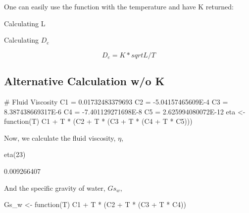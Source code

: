 \documentclass{tufte-handout}
\begin{document}
One can easily use the function with the temperature and have K returned: 

\begin{Schunk}
\begin{Sinput}
 
\end{Sinput}
\end{Schunk}

Calculating L

\begin{Schunk}
\begin{Sinput}
 
\end{Sinput}
\end{Schunk}

Calculating $D_e$

\begin{equation}
D_e = K * sqrt{L/T}
\end{equation}

\begin{Schunk}
\begin{Sinput}
 
\end{Sinput}
\end{Schunk}

\subsection{Alternative Calculation w/o K}

\begin{Schunk}
\begin{Sinput}
 # Fluid Viscosity
 C1 = 0.01732483379693
 C2 = -5.04157465609E-4
 C3 = 8.387438669317E-6
 C4 = -7.401129271698E-8
 C5 = 2.625994080072E-12
 eta <- function(T){
 C1 + T * (C2 + T * (C3 + T * (C4 + T * C5)))
 } 
\end{Sinput}
\end{Schunk}

Now, we calculate the fluid viscosity, $\eta$, 

\begin{Schunk}
\begin{Sinput}
 eta(23)
\end{Sinput}
\begin{Soutput}
[1] 0.009266407
\end{Soutput}
\end{Schunk}


And the specific gravity of water, $Gs_w$, 

\begin{Schunk}
\begin{Sinput}
 Gs_w <- function(T){
 C1 + T * (C2 + T * (C3 + T * C4))}
\end{Sinput}
\end{Schunk}
\end{document}
